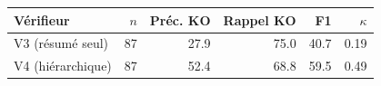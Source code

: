 \begin{tabular}{lrrrrr}
\hline
Vérifieur & $n$ & Préc. KO & Rappel KO & F1 & $\kappa$ \\
\hline
V3 (résumé seul) & 87 & 27.9 & 75.0 & 40.7 & 0.19 \\
V4 (hiérarchique) & 87 & 52.4 & 68.8 & 59.5 & 0.49 \\
\hline
\end{tabular}